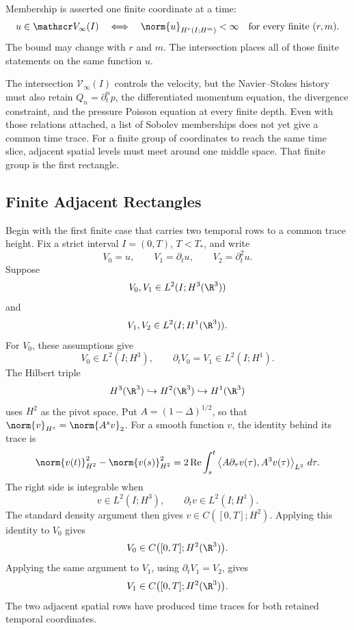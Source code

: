 Membership is asserted one finite coordinate at a time:
\[
  u\in\mathscr V_\infty(I)
  \quad\Longleftrightarrow\quad
  \norm{u}_{H^r(I;H^m)}
  <
  \infty
  \quad
  \text{for every finite }(r,m).
\]
The bound may change with \(r\) and \(m\).
The intersection places all of those finite statements on the same function \(u\).

The intersection \(\mathscr V_\infty(I)\) controls the velocity, but the Navier--Stokes history must also retain \(Q_n=\partial_t^np\), the differentiated momentum equation, the divergence constraint, and the pressure Poisson equation at every finite depth.
Even with those relations attached, a list of Sobolev memberships does not yet give a common time trace.
For a finite group of coordinates to reach the same time slice, adjacent spatial levels must meet around one middle space.
That finite group is the first rectangle.


\subsection{Finite Adjacent Rectangles}\label{sub:FiniteAdjacentRectangles}

Begin with the first finite case that carries two temporal rows to a common trace height.
Fix a strict interval \(I=(0,T)\), \(T<T_*\), and write
\[
  V_0=u,
  \qquad
  V_1=\partial_tu,
  \qquad
  V_2=\partial_t^2u.
\]
Suppose
\[
  V_0,V_1
  \in
  L^2(I;H^3(\R^3))
\]
and
\[
  V_1,V_2
  \in
  L^2(I;H^1(\R^3)).
\]
For \(V_0\), these assumptions give
\[
  V_0\in L^2(I;H^3),
  \qquad
  \partial_tV_0=V_1\in L^2(I;H^1).
\]
The Hilbert triple
\[
  H^3(\R^3)
  \hookrightarrow
  H^2(\R^3)
  \hookrightarrow
  H^1(\R^3)
\]
uses \(H^2\) as the pivot space.
Put \(A=(1-\Delta)^{1/2}\), so that \(\norm{v}_{H^s}=\norm{A^sv}_2\).
For a smooth function \(v\), the identity behind its trace is
\[
  \norm{v(t)}_{H^2}^2
  -
  \norm{v(s)}_{H^2}^2
  =
  2\operatorname{Re}\int_s^t
  \left\langle
    A\partial_\tau v(\tau),
    A^3v(\tau)
  \right\rangle_{L^2}
  \,d\tau.
\]
The right side is integrable when
\[
  v\in L^2(I;H^3),
  \qquad
  \partial_tv\in L^2(I;H^1).
\]
The standard density argument then gives \(v\in C([0,T];H^2)\).
Applying this identity to \(V_0\) gives
\[
  V_0\in C\bigl([0,T];H^2(\R^3)\bigr).
\]
Applying the same argument to \(V_1\), using \(\partial_tV_1=V_2\), gives
\[
  V_1\in C\bigl([0,T];H^2(\R^3)\bigr).
\]
The two adjacent spatial rows have produced time traces for both retained temporal coordinates.

